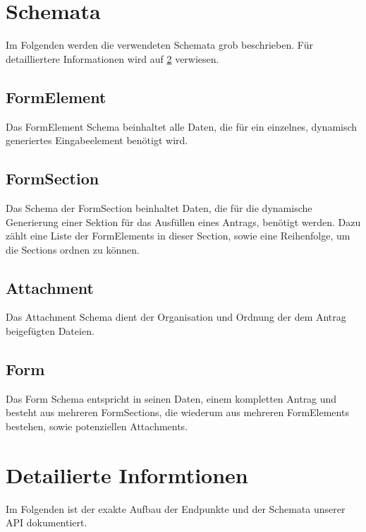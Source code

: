 \section{Schemata}
Im Folgenden werden die verwendeten Schemata grob beschrieben. Für detailliertere Informationen
wird auf \ref{sec:Detailiertere Informationen} verwiesen.

\subsection{FormElement}
Das FormElement Schema beinhaltet alle Daten, die für ein einzelnes, dynamisch generiertes
Eingabeelement benötigt wird.

\subsection{FormSection}
Das Schema der FormSection beinhaltet Daten, die für die dynamische Generierung einer Sektion
für das Ausfüllen eines Antrags, benötigt werden. Dazu zählt eine Liste der FormElements in
dieser Section, sowie eine Reihenfolge, um die Sections ordnen zu können.

\subsection{Attachment}
Das Attachment Schema dient der Organisation und Ordnung der dem Antrag beigefügten Dateien.

\subsection{Form}
Das Form Schema entspricht in seinen Daten, einem kompletten Antrag und besteht aus mehreren
FormSections, die wiederum aus mehreren FormElements bestehen, sowie potenziellen Attachments.

\section{Detailierte Informtionen}\label{sec:Detailiertere Informationen}
Im Folgenden ist der exakte Aufbau der Endpunkte und der Schemata unserer \ac{API} dokumentiert.

